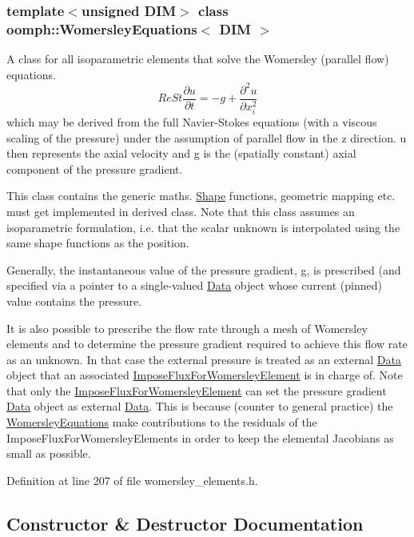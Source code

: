 \subsubsection*{template$<$unsigned D\+IM$>$\newline
class oomph\+::\+Womersley\+Equations$<$ D\+I\+M $>$}

A class for all isoparametric elements that solve the Womersley (parallel flow) equations. \[ Re St \frac{\partial u}{\partial t} = - g + \frac{\partial^2 u}{\partial x_i^2} \] which may be derived from the full Navier-\/\+Stokes equations (with a viscous scaling of the pressure) under the assumption of parallel flow in the z direction. u then represents the axial velocity and g is the (spatially constant) axial component of the pressure gradient.

This class contains the generic maths. \hyperlink{classoomph_1_1Shape}{Shape} functions, geometric mapping etc. must get implemented in derived class. Note that this class assumes an isoparametric formulation, i.\+e. that the scalar unknown is interpolated using the same shape functions as the position.

Generally, the instantaneous value of the pressure gradient, g, is prescribed (and specified via a pointer to a single-\/valued \hyperlink{classoomph_1_1Data}{Data} object whose current (pinned) value contains the pressure.

It is also possible to prescribe the flow rate through a mesh of Womersley elements and to determine the pressure gradient required to achieve this flow rate as an unknown. In that case the external pressure is treated as an external \hyperlink{classoomph_1_1Data}{Data} object that an associated \hyperlink{classoomph_1_1ImposeFluxForWomersleyElement}{Impose\+Flux\+For\+Womersley\+Element} is in charge of. Note that only the \hyperlink{classoomph_1_1ImposeFluxForWomersleyElement}{Impose\+Flux\+For\+Womersley\+Element} can set the pressure gradient \hyperlink{classoomph_1_1Data}{Data} object as external \hyperlink{classoomph_1_1Data}{Data}. This is because (counter to general practice) the \hyperlink{classoomph_1_1WomersleyEquations}{Womersley\+Equations} make contributions to the residuals of the Impose\+Flux\+For\+Womersley\+Elements in order to keep the elemental Jacobians as small as possible. 

Definition at line 207 of file womersley\+\_\+elements.\+h.



\subsection{Constructor \& Destructor Documentation}
\mbox{\label{classoomph_1_1WomersleyEquations_a22ad21d028f961d08c2ec17ed59bd88b}} 
